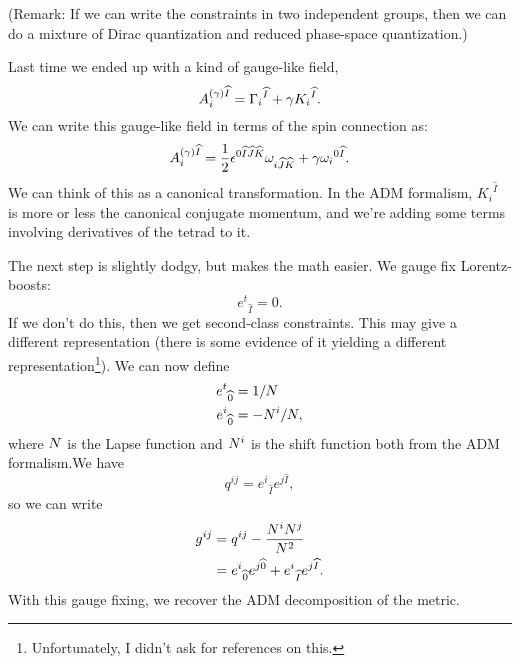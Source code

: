 \lecture

(Remark: If we can write the constraints in two independent groups, then
we can do a mixture of Dirac quantization and reduced phase-space
quantization.)

Last time we ended up with a kind of gauge-like field,
\begin{equation}
A^{(\gamma)\widehat{I}}_{i} =  {\Gamma_{i}}^{\widehat{I}} + \gamma{K_{i}}^{\widehat{I}}.
\end{equation}
We can write this gauge-like field in terms of the spin connection as:
\begin{equation}
A^{(\gamma)\widehat{I}}_{i} =  \frac{1}{2}\epsilon^{0\widehat{I}\widehat{J}\widehat{K}}\omega_{i\widehat{J}\widehat{K}}
+\gamma {\omega_{i}}^{0\widehat{I}}.
\end{equation}
We can think of this as a canonical transformation. In the ADM
formalism, ${K_{i}}^{\widehat{I}}$ is more or less the canonical
conjugate momentum, and we're adding some terms involving derivatives of
the tetrad to it.

The next step is slightly dodgy, but makes the math easier. We gauge fix
Lorentz-boosts:
\begin{equation}
{e^{t}}_{\widehat{I}}=0.
\end{equation}
If we don't do this, then we get second-class constraints. This may give
a different representation (there is some evidence of it yielding a
different representation\footnote{Unfortunately, I didn't ask for
references on this.}). We can now define
\begin{subequations}
\begin{align}
{e^{t}}_{\widehat{0}} &= 1/N\\
{e^{i}}_{\widehat{0}} &= -N^{i}/N,
\end{align}
\end{subequations}
where $N$ is the Lapse function and $N^{i}$ is the shift function
both from the ADM formalism.We have
\begin{equation}
q^{ij} = {e^{i}}_{\widehat{I}}e^{j\widehat{I}},
\end{equation}
so we can write
\begin{subequations}
\begin{align}
g^{ij} &= q^{ij} - \frac{N^{i}N^{j}}{N^{2}}\\
  &={e^{i}}_{\widehat{0}}e^{j\widehat{0}} + {e^{i}}_{\widehat{I}}e^{j\widehat{I}}.
\end{align}
\end{subequations}
With this gauge fixing, we recover the ADM decomposition of the metric.

